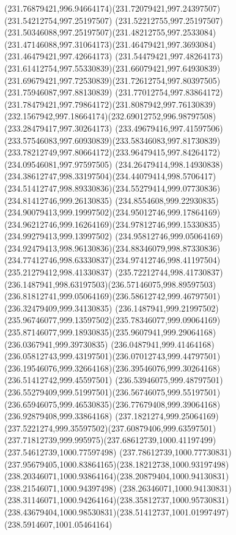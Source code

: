 {{  \curveto(231.76879421,996.94664174)(231.72079421,997.24397507)(231.54212754,997.25197507)
  \curveto(231.52212755,997.25197507)(231.50346088,997.25197507)(231.48212755,997.2533084)
  \curveto(231.47146088,997.31064173)(231.46479421,997.3693084)(231.46479421,997.42664173)
  \curveto(231.54479421,997.48264173)(231.61412754,997.55330839)(231.66079421,997.64930839)
  \curveto(231.69679421,997.72530839)(231.72612754,997.80397505)(231.75946087,997.88130839)
  \curveto(231.77012754,997.83864172)(231.78479421,997.79864172)(231.8087942,997.76130839)
  \curveto(232.1567942,997.18664174)(232.69012752,996.98797508)(233.28479417,997.30264173)
  \curveto(233.49679416,997.41597506)(233.57546083,997.60930839)(233.58346083,997.81730839)
  \curveto(233.78212749,997.80664172)(233.96479415,997.84264172)(234.09546081,997.97597505)
  \curveto(234.26479414,998.14930838)(234.38612747,998.33197504)(234.44079414,998.5706417)
  \curveto(234.51412747,998.89330836)(234.55279414,999.07730836)(234.81412746,999.26130835)
  \curveto(234.8554608,999.22930835)(234.90079413,999.19997502)(234.95012746,999.17864169)
  \curveto(234.96212746,999.16264169)(234.97812746,999.15330835)(234.99279413,999.13997502)
  \curveto(234.95812746,999.05064169)(234.92479413,998.96130836)(234.88346079,998.87330836)
  \curveto(234.77412746,998.63330837)(234.97412746,998.41197504)(235.21279412,998.41330837)
  \curveto(235.72212744,998.41730837)(236.1487941,998.63197503)(236.57146075,998.89597503)
  \curveto(236.81812741,999.05064169)(236.58612742,999.46797501)(236.32479409,999.34130835)
  \curveto(236.1487941,999.21997502)(235.96746077,999.13597502)(235.78346077,999.09064169)
  \curveto(235.87146077,999.18930835)(235.9607941,999.29064168)(236.0367941,999.39730835)
  \curveto(236.0487941,999.41464168)(236.05812743,999.43197501)(236.07012743,999.44797501)
  \curveto(236.19546076,999.32664168)(236.39546076,999.30264168)(236.51412742,999.45597501)
  \curveto(236.53946075,999.48797501)(236.55279409,999.51997501)(236.56746075,999.55197501)
  \curveto(236.65946075,999.46530835)(236.77679408,999.39064168)(236.92879408,999.33864168)
  \curveto(237.1821274,999.25064169)(237.5221274,999.35597502)(237.60879406,999.63597501)
  \curveto(237.71812739,999.995975)(237.68612739,1000.41197499)(237.54612739,1000.77597498)
  \curveto(237.78612739,1000.77730831)(237.95679405,1000.83864165)(238.18212738,1000.93197498)
  \curveto(238.20346071,1000.93864164)(238.20879404,1000.94130831)(238.21546071,1000.94397498)
  \curveto(238.26346071,1000.94130831)(238.31146071,1000.94264164)(238.35812737,1000.95730831)
  \curveto(238.43679404,1000.98530831)(238.51412737,1001.01997497)(238.5914607,1001.05464164)
}}
